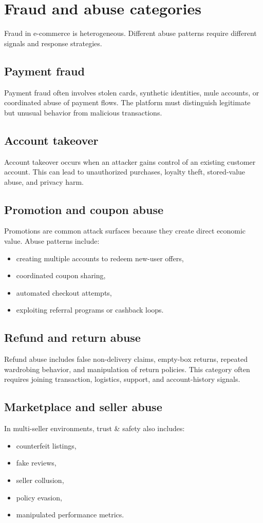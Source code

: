 \section{Fraud and abuse categories}
Fraud in e-commerce is heterogeneous.
Different abuse patterns require different signals and response strategies.

\subsection{Payment fraud}
Payment fraud often involves stolen cards, synthetic identities, mule accounts, or coordinated abuse of payment flows.
The platform must distinguish legitimate but unusual behavior from malicious transactions.

\subsection{Account takeover}
Account takeover occurs when an attacker gains control of an existing customer account.
This can lead to unauthorized purchases, loyalty theft, stored-value abuse, and privacy harm.

\subsection{Promotion and coupon abuse}
Promotions are common attack surfaces because they create direct economic value.
Abuse patterns include:
\begin{itemize}
  \item creating multiple accounts to redeem new-user offers,
  \item coordinated coupon sharing,
  \item automated checkout attempts,
  \item exploiting referral programs or cashback loops.
\end{itemize}

\subsection{Refund and return abuse}
Refund abuse includes false non-delivery claims, empty-box returns, repeated wardrobing behavior, and manipulation of return policies.
This category often requires joining transaction, logistics, support, and account-history signals.

\subsection{Marketplace and seller abuse}
In multi-seller environments, trust \& safety also includes:
\begin{itemize}
  \item counterfeit listings,
  \item fake reviews,
  \item seller collusion,
  \item policy evasion,
  \item manipulated performance metrics.
\end{itemize}

